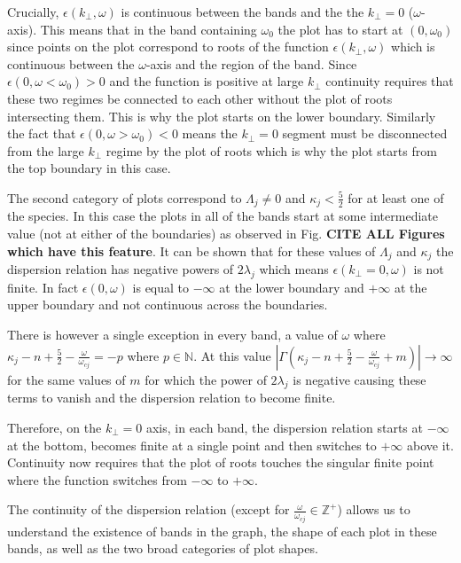 \documentclass[12pt,a4paper]{article}
\begin{document}
    Crucially, $\epsilon(k_\perp, \omega)$ is continuous between the bands and the the $k_\perp = 0$ ($\omega$-axis).
    This means that in the band containing $\omega_0$ the plot has to start at $(0, \omega_0)$ since points on the plot correspond to roots of the function $\epsilon(k_\perp, \omega)$ which is continuous between the $\omega$-axis and the region of the band.
    Since $\epsilon(0, \omega < \omega_0) > 0$ and the function is positive at large $k_\perp$ continuity requires that these two regimes be connected to each other without the plot of roots intersecting them.
    This is why the plot starts on the lower boundary.
    Similarly the fact that $\epsilon(0, \omega > \omega_0) < 0$ means the $k_\perp = 0$ segment must be disconnected from the large $k_\perp$ regime by the plot of roots which is why the plot starts from the top boundary in this case.

    The second category of plots correspond to $\Lambda_j \neq 0$ and $\kappa_j < \frac{5}{2}$ for at least one of the species.
    In this case the plots in all of the bands start at some intermediate value (not at either of the boundaries) as observed in Fig. \textbf{CITE ALL Figures which have this feature}.
    It can be shown that for these values of $\Lambda_j$ and $\kappa_j$ the dispersion relation has negative powers of $2 \lambda_j$ which means $\epsilon(k_\perp = 0, \omega)$ is not finite.
    In fact $\epsilon(0, \omega)$ is equal to $-\infty$ at the lower boundary and $+\infty$ at the upper boundary and not continuous across the boundaries.

    There is however a single exception in every band, a value of $\omega$ where $\kappa_j - n + \frac{5}{2} - \frac{\omega}{\omega_{cj}} = -p$ where $p \in \mathbb{N}$.
    At this value $\left| \Gamma (\kappa_j - n + \frac{5}{2} - \frac{\omega}{\omega_{cj}} + m) \right| \rightarrow \infty$ for the same values of $m$ for which the power of $2 \lambda_j$ is negative causing these terms to vanish and the dispersion relation to become finite.

    Therefore, on the $k_\perp = 0$ axis, in each band, the dispersion relation starts at $-\infty$ at the bottom, becomes finite at a single point and then switches to $+\infty$ above it.
    Continuity now requires that the plot of roots touches the singular finite point where the function switches from $-\infty$ to $+\infty$.

    The continuity of the dispersion relation (except for $\frac{\omega}{\omega_{cj}} \in \mathbb{Z}^+$) allows us to understand the existence of bands in the graph, the shape of each plot in these bands, as well as the two broad categories of plot shapes.
\end{document}
